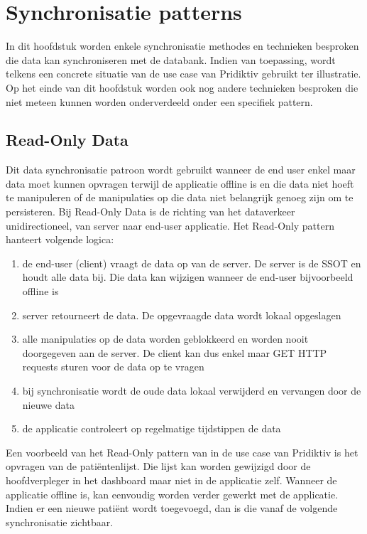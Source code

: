 
\chapter{Synchronisatie patterns}
\label{ch:synchronisatiemethdodes}


In dit hoofdstuk worden enkele synchronisatie methodes en technieken besproken die data kan synchroniseren met de databank. Indien van toepassing, wordt telkens een concrete situatie van de use case van Pridiktiv gebruikt ter illustratie. Op het einde van dit hoofdstuk worden ook nog andere technieken besproken die niet meteen kunnen worden onderverdeeld onder een specifiek pattern.

\section{Read-Only Data}
Dit data synchronisatie patroon wordt gebruikt wanneer de end user enkel maar data moet kunnen opvragen terwijl de applicatie offline is en die data niet hoeft te manipuleren of de manipulaties op die data niet belangrijk genoeg zijn om te persisteren. Bij Read-Only Data is de richting van het dataverkeer unidirectioneel, van server naar end-user applicatie. Het Read-Only pattern hanteert volgende logica:
\begin{enumerate}
\item de end-user (client) vraagt de data op van de server. De server is de SSOT en houdt alle data bij. Die data kan wijzigen wanneer de end-user bijvoorbeeld offline is
\item server retourneert de data. De opgevraagde data wordt lokaal opgeslagen
\item alle manipulaties op de data worden geblokkeerd en worden nooit doorgegeven aan de server. De client kan dus enkel maar GET HTTP requests sturen voor de data op te vragen
\item bij synchronisatie wordt de oude data lokaal verwijderd en vervangen door de nieuwe data
\item de applicatie controleert op regelmatige tijdstippen de data
\end{enumerate}
Een voorbeeld van het Read-Only pattern van in de use case van Pridiktiv is het opvragen van de pati\"entenlijst. Die lijst kan worden gewijzigd door de hoofdverpleger in het dashboard maar niet in de applicatie zelf. Wanneer de applicatie offline is, kan eenvoudig worden verder gewerkt met de applicatie. Indien er een nieuwe pati\"ent wordt toegevoegd, dan is die vanaf de volgende synchronisatie zichtbaar.
